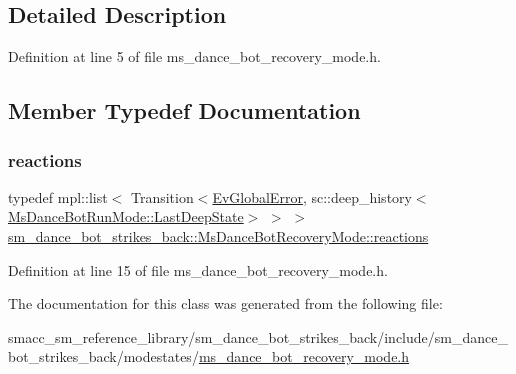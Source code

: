 \subsection{Detailed Description}


Definition at line 5 of file ms\+\_\+dance\+\_\+bot\+\_\+recovery\+\_\+mode.\+h.



\subsection{Member Typedef Documentation}
\mbox{\label{classsm__dance__bot__strikes__back_1_1MsDanceBotRecoveryMode_a65130a5e7f6d6179ea3651ee6c6d8b66}} 
\subsubsection{\texorpdfstring{reactions}{reactions}}
{\footnotesize\ttfamily typedef mpl\+::list$<$ Transition$<$\hyperlink{structsm__dance__bot__strikes__back_1_1EvGlobalError}{Ev\+Global\+Error}, sc\+::deep\+\_\+history$<$\hyperlink{classsmacc_1_1SmaccState_a60088405d2d99d468caa0baa3b2830a8}{Ms\+Dance\+Bot\+Run\+Mode\+::\+Last\+Deep\+State}$>$ $>$ $>$ \hyperlink{classsm__dance__bot__strikes__back_1_1MsDanceBotRecoveryMode_a65130a5e7f6d6179ea3651ee6c6d8b66}{sm\+\_\+dance\+\_\+bot\+\_\+strikes\+\_\+back\+::\+Ms\+Dance\+Bot\+Recovery\+Mode\+::reactions}}



Definition at line 15 of file ms\+\_\+dance\+\_\+bot\+\_\+recovery\+\_\+mode.\+h.



The documentation for this class was generated from the following file\+:\begin{DoxyCompactItemize}
\item 
smacc\+\_\+sm\+\_\+reference\+\_\+library/sm\+\_\+dance\+\_\+bot\+\_\+strikes\+\_\+back/include/sm\+\_\+dance\+\_\+bot\+\_\+strikes\+\_\+back/modestates/\hyperlink{strikes__back_2include_2sm__dance__bot__strikes__back_2modestates_2ms__dance__bot__recovery__mode_8h}{ms\+\_\+dance\+\_\+bot\+\_\+recovery\+\_\+mode.\+h}\end{DoxyCompactItemize}
